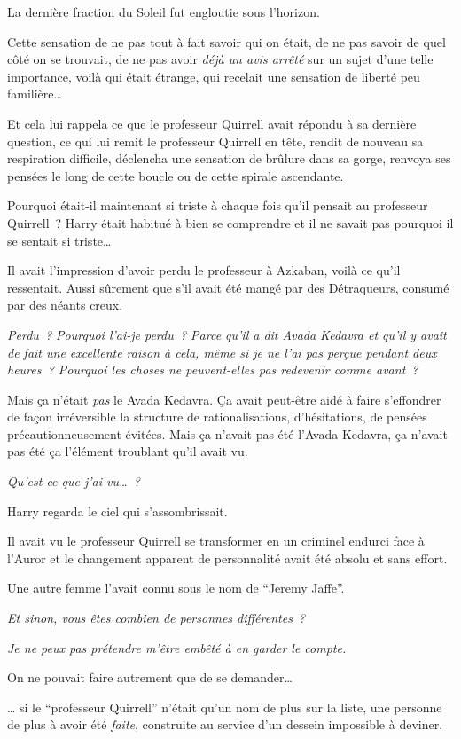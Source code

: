 La dernière fraction du Soleil fut engloutie sous l'horizon.

Cette sensation de ne pas tout à fait savoir qui on était, de ne pas savoir de quel côté on se trouvait, de ne pas avoir \emph{déjà un avis arrêté} sur un sujet d'une telle importance, voilà qui était étrange, qui recelait une sensation de liberté peu familière…

Et cela lui rappela ce que le professeur Quirrell avait répondu à sa dernière question, ce qui lui remit le professeur Quirrell en tête, rendit de nouveau sa respiration difficile, déclencha une sensation de brûlure dans sa gorge, renvoya ses pensées le long de cette boucle ou de cette spirale ascendante.

Pourquoi était-il maintenant si triste à chaque fois qu'il pensait au professeur Quirrell~?
Harry était habitué à bien se comprendre et il ne savait pas pourquoi il se sentait si triste…

Il avait l'impression d'avoir perdu le professeur à Azkaban, voilà ce qu'il ressentait.
Aussi sûrement que s'il avait été mangé par des Détraqueurs, consumé par des néants creux.

\emph{Perdu~?
Pourquoi l'ai-je perdu~?
Parce qu'il a dit Avada Kedavra et qu'il y avait de fait une excellente raison à cela, même si je ne l'ai pas perçue pendant deux heures~?
Pourquoi les choses ne peuvent-elles pas redevenir comme avant~?}

Mais ça n'était \emph{pas} le Avada Kedavra.
Ça avait peut-être aidé à faire s'effondrer de façon irréversible la structure de rationalisations, d'hésitations, de pensées précautionneusement évitées.
Mais ça n'avait pas été l'Avada Kedavra, ça n'avait pas été ça l'élément troublant qu'il avait vu.

\emph{Qu'est-ce que j'ai vu…~?}

Harry regarda le ciel qui s'assombrissait.

Il avait vu le professeur Quirrell se transformer en un criminel endurci face à l'Auror et le changement apparent de personnalité avait été absolu et sans effort.

Une autre femme l'avait connu sous le nom de “Jeremy Jaffe”.

\emph{Et sinon, vous êtes combien de personnes différentes~?}

\emph{Je ne peux pas prétendre m'être embêté à en garder le compte.}

On ne pouvait faire autrement que de se demander…

… si le “professeur Quirrell” n'était qu'un nom de plus sur la liste, une personne de plus à avoir été \emph{faite}, construite au service d'un dessein impossible à deviner.


